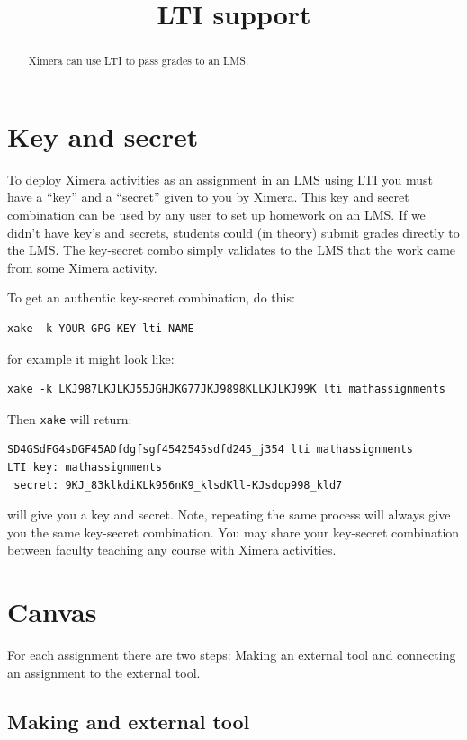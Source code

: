 \documentclass{ximera}
\title{LTI support}
\begin{document}
\begin{abstract}
Ximera can use LTI to pass grades to an LMS.
\end{abstract}
\maketitle

\section{Key and secret}

To deploy Ximera activities as an assignment in an LMS using LTI you
must have a ``key'' and a ``secret'' given to you by Ximera. This key
and secret combination can be used by any user to set up homework on
an LMS. If we didn't have key's and secrets, students could (in
theory) submit grades directly to the LMS. The key-secret combo simply
validates to the LMS that the work came from some Ximera activity.

To get an authentic key-secret combination, do this:

\begin{verbatim}
xake -k YOUR-GPG-KEY lti NAME
\end{verbatim}
for example it might look like:
\begin{verbatim}
xake -k LKJ987LKJLKJ55JGHJKG77JKJ9898KLLKJLKJ99K lti mathassignments
\end{verbatim}
Then \verb|xake| will return:
\begin{verbatim}
SD4GSdFG4sDGF45ADfdgfsgf4542545sdfd245_j354 lti mathassignments
LTI key: mathassignments
 secret: 9KJ_83klkdiKLk956nK9_klsdKll-KJsdop998_kld7        
\end{verbatim}

will give you a key and secret. Note, repeating the same process will
always give you the same key-secret combination. You may share your
key-secret combination between faculty teaching any course with Ximera
activities.

\section{Canvas}

For each assignment there are two steps: Making an external tool and connecting an assignment to the external tool.

\subsection{Making and external tool}
\end{document}
